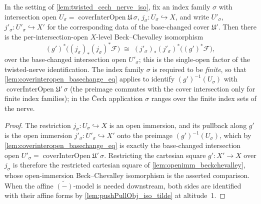 \begin{lemma}

  \label{lem:twisted_cech_nerve_per_sigma}
  In the setting of \cref{lem:twisted_cech_nerve_iso}, fix an index family \(\sigma\) with
  intersection open \(U_\sigma = \operatorname{coverInterOpen}\mathfrak{U}\,\sigma\),
  \(j_\sigma : U_\sigma \hookrightarrow X\), and write \(U'_\sigma\),
  \(j'_\sigma : U'_\sigma \hookrightarrow X'\) for the corresponding data of the base-changed
  cover \(\mathfrak{U}'\). Then there is the per-intersection-open \(X\)-level Beck--Chevalley
  isomorphism
  \[
    (g')^*\bigl((j_\sigma)_* (j_\sigma)^*\mathcal{F}\bigr)
      \;\cong\;
    (j'_\sigma)_* (j'_\sigma)^*\bigl((g')^*\mathcal{F}\bigr),
  \]
  over the base-changed intersection open \(U'_\sigma\); this is the single-open factor of the
  twisted-nerve identification. The index family \(\sigma\) is required to be \emph{finite}, so
  that \cref{lem:coverinteropen_basechange_eq} applies to identify
  \((g')^{-1}(U_\sigma)\) with \(\operatorname{coverInterOpen}\mathfrak{U}'\,\sigma\) (the
  preimage commutes with the cover intersection only for finite index families); in the
  {\v C}ech application \(\sigma\) ranges over the finite index sets of the nerve.
\end{lemma}
\begin{proof}\leanok
  The restriction \(j_\sigma : U_\sigma \hookrightarrow X\) is an open immersion, and its
  pullback along \(g'\) is the open immersion \(j'_\sigma : U'_\sigma \hookrightarrow X'\) onto
  the preimage \((g')^{-1}(U_\sigma)\), which by \cref{lem:coverinteropen_basechange_eq} is
  exactly the base-changed intersection open
  \(U'_\sigma = \operatorname{coverInterOpen}\mathfrak{U}'\,\sigma\). Restricting the cartesian
  square \(g' : X' \to X\) over \(j_\sigma\) is therefore the restricted cartesian square of
  \cref{lem:openimm_beckchevalley}, whose open-immersion Beck--Chevalley isomorphism is the
  asserted comparison. When the affine \(\widetilde{(-)}\)-model is needed downstream, both
  sides are identified with their affine forms by \cref{lem:pushPullObj_iso_tilde} at
  altitude~1.
\end{proof}

